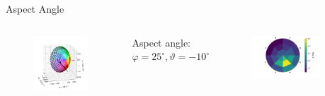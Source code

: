 \documentclass{beamer}
\begin{document}
\begin{frame}{Aspect Angle}
\begin{columns}
	\vspace{-0.8cm}
		\begin{figure}
			\includegraphics[scale=0.4]{Pics/col_aa_marker.png}
		\end{figure}
\begin{center}
	{\small 	Aspect angle:\\
	$\varphi = 25 ^\circ, \vartheta = -10 ^\circ $}
\end{center}
	
	\column[]{6cm}
	
		\begin{figure}
			\includegraphics[scale=0.4]{Pics/hist_det_sec_aa_90days2001.pdf}
		\end{figure}
\begin{center}
		

\end{center}
\end{columns}
\end{frame}
\end{document}
